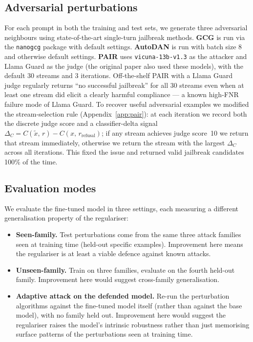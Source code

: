 \documentclass[11pt]{article}
\begin{document}
\subsection{Adversarial perturbations}
For each prompt in both the training and test sets, we generate three
adversarial neighbours using state-of-the-art single-turn jailbreak methods.
\textbf{GCG} \citep{zou2023gcg} is run via the \texttt{nanogcg} package with
default settings.
\textbf{AutoDAN} \citep{liu2024autodan} is run with batch size 8 and otherwise
default settings.
\textbf{PAIR} \citep{chao2023pair} uses \texttt{vicuna-13b-v1.3}
\citep{zheng2023vicuna} as the attacker and Llama Guard as the judge (the original paper also used these models), with the
default 30 streams and 3 iterations. Off-the-shelf PAIR with a Llama Guard
judge regularly returns ``no successful jailbreak'' for all 30 streams even
when at least one stream did elicit a clearly harmful compliance --- a known
high-FNR failure mode of Llama Guard. To recover useful adversarial examples
we modified the stream-selection rule (Appendix~\ref{app:pair}): at each
iteration we record both the discrete judge score and a
classifier-delta signal $\Delta_C = C(\tilde{x},\,r) - C(x,\,r_{\text{refusal}})$;
if any stream achieves judge score~10 we return that stream immediately,
otherwise we return the stream with the largest $\Delta_C$ across all
iterations. This fixed the issue and returned valid jailbreak candidates 100\% of the time.

\subsection{Evaluation modes}
We evaluate the fine-tuned model in three settings, each measuring a
different generalisation property of the regulariser:
\begin{itemize}
\item \textbf{Seen-family.} Test perturbations come from the same three
attack families seen at training time (held-out specific examples).
Improvement here means the regulariser is at least a viable defence against
known attacks.
\item \textbf{Unseen-family.} Train on three families, evaluate on the
fourth held-out family. Improvement here would suggest cross-family
generalisation.
\item \textbf{Adaptive attack on the defended model.} Re-run the
perturbation algorithms against the fine-tuned model itself (rather than
against the base model), with no family held out. Improvement here would
suggest the regulariser raises the model's intrinsic robustness rather than
just memorising surface patterns of the perturbations seen at training time.
\end{itemize}
\end{document}
